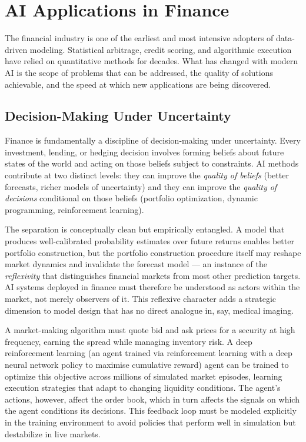 \section{AI Applications in Finance}
\label{sec:ai-applications-finance}

The financial industry is one of the earliest and most intensive adopters
of data-driven modeling.  Statistical arbitrage, credit scoring, and
algorithmic execution have relied on quantitative methods for decades.
What has changed with modern AI is the scope of problems that can be
addressed, the quality of solutions achievable, and the speed at which
new applications are being discovered.

\subsection{Decision-Making Under Uncertainty}
\label{subsec:decision-making-uncertainty}

Finance is fundamentally a discipline of decision-making under uncertainty.
Every investment, lending, or hedging decision involves forming beliefs about
future states of the world and acting on those beliefs subject to constraints.
AI methods contribute at two distinct levels: they can improve the
\emph{quality of beliefs} (better forecasts, richer models of uncertainty)
and they can improve the \emph{quality of decisions} conditional on those
beliefs (portfolio optimization, dynamic programming, reinforcement learning).

The separation is conceptually clean but empirically entangled.  A model
that produces well-calibrated probability estimates over future returns
enables better portfolio construction, but the portfolio construction
procedure itself may reshape market dynamics and invalidate the forecast
model --- an instance of the \emph{reflexivity} that distinguishes financial
markets from most other prediction targets.  AI systems deployed in
finance must therefore be understood as actors within the market, not
merely observers of it.  This reflexive character adds a strategic
dimension to model design that has no direct analogue in, say, medical
imaging.

\begin{example}
\label{ex:algo-trading}
A market-making algorithm must quote bid and ask prices for a security at
high frequency, earning the spread while managing inventory risk.  A
deep reinforcement learning (an agent trained via reinforcement learning with a deep neural network policy to maximise cumulative reward) agent can be trained to optimize this
objective across millions of simulated market episodes, learning execution
strategies that adapt to changing liquidity conditions.  The agent's
actions, however, affect the order book, which in turn affects the signals
on which the agent conditions its decisions.  This feedback loop must be
modeled explicitly in the training environment to avoid policies that
perform well in simulation but destabilize in live markets.
\end{example}

